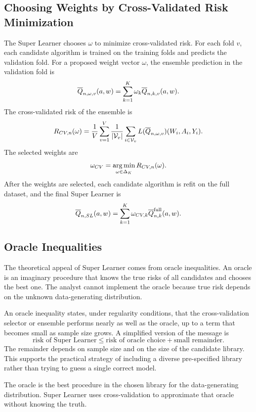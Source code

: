 \subsection{Choosing Weights by Cross-Validated Risk Minimization}

The Super Learner chooses $\omega$ to minimize cross-validated risk. For each fold
$v$, each candidate algorithm is trained on the training folds and predicts the
validation fold. For a proposed weight vector $\omega$, the ensemble prediction in
the validation fold is
\[
\overline{Q}_{n,\omega,v}(a,w)
=
\sum_{k=1}^K\omega_k\overline{Q}_{n,k,v}(a,w).
\]
The cross-validated risk of the ensemble is
\[
R_{CV,n}(\omega)
=
\frac{1}{V}\sum_{v=1}^V
\frac{1}{|\mathcal V_v|}
\sum_{i\in\mathcal V_v}
L(\overline{Q}_{n,\omega,v})(W_i,A_i,Y_i).
\]
The selected weights are
\[
\omega_{CV}
=
\operatorname*{arg\,min}_{\omega\in\Delta_K}R_{CV,n}(\omega).
\]
After the weights are selected, each candidate algorithm is refit on the full dataset,
and the final Super Learner is
\[
\overline{Q}_{n,SL}(a,w)
=
\sum_{k=1}^K\omega_{CV,k}\overline{Q}_{n,k}^{\mathrm{full}}(a,w).
\]

\subsection{Oracle Inequalities}

The theoretical appeal of Super Learner comes from oracle inequalities. An oracle is
an imaginary procedure that knows the true risks of all candidates and chooses the
best one. The analyst cannot implement the oracle because true risk depends on the
unknown data-generating distribution.

An oracle inequality states, under regularity conditions, that the cross-validation
selector or ensemble performs nearly as well as the oracle, up to a term that becomes
small as sample size grows. A simplified version of the message is
\[
\text{risk of Super Learner}
\le
\text{risk of oracle choice}
+
\text{small remainder}.
\]
The remainder depends on sample size and on the size of the candidate library. This
supports the practical strategy of including a diverse pre-specified library rather than
trying to guess a single correct model.

\begin{keyidea}
The oracle is the best procedure in the chosen library for the data-generating
distribution. Super Learner uses cross-validation to approximate that oracle without
knowing the truth.
\end{keyidea}

